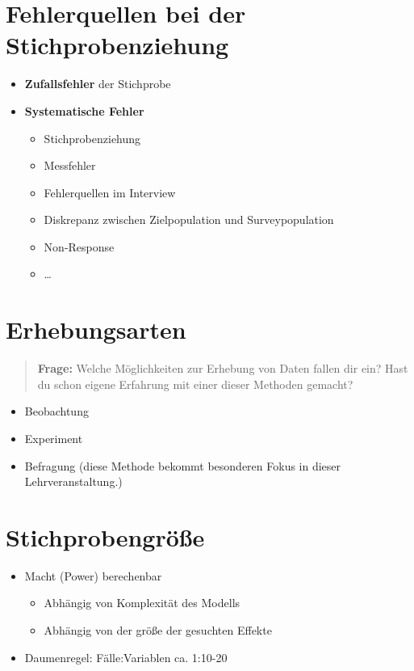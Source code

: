 \documentclass[
]{book}
\providecommand{\tightlist}{%
  \setlength{\itemsep}{0pt}\setlength{\parskip}{0pt}}
\begin{document}
\hypertarget{fehlerquellen-bei-der-stichprobenziehung}{%
\section{Fehlerquellen bei der Stichprobenziehung}\label{fehlerquellen-bei-der-stichprobenziehung}}

\begin{itemize}
\tightlist
\item
  \textbf{Zufallsfehler} der Stichprobe
\item
  \textbf{Systematische Fehler}

  \begin{itemize}
  \tightlist
  \item
    Stichprobenziehung
  \item
    Messfehler
  \item
    Fehlerquellen im Interview
  \item
    Diskrepanz zwischen Zielpopulation und Surveypopulation
  \item
    Non-Response
  \item
    \ldots{}
  \end{itemize}
\end{itemize}

\hypertarget{erhebungsarten}{%
\section{Erhebungsarten}\label{erhebungsarten}}

\begin{quote}
\textbf{Frage:} Welche Möglichkeiten zur Erhebung von Daten fallen dir ein? Hast du schon eigene Erfahrung mit einer dieser Methoden gemacht?
\end{quote}

\begin{itemize}
\tightlist
\item
  Beobachtung
\item
  Experiment
\item
  Befragung (diese Methode bekommt besonderen Fokus in dieser Lehrveranstaltung.)
\end{itemize}

\hypertarget{stichprobengruxf6uxdfe}{%
\section{Stichprobengröße}\label{stichprobengruxf6uxdfe}}

\begin{itemize}
\tightlist
\item
  Macht (Power) berechenbar

  \begin{itemize}
  \tightlist
  \item
    Abhängig von Komplexität des Modells
  \item
    Abhängig von der größe der gesuchten Effekte
  \end{itemize}
\item
  Daumenregel: Fälle:Variablen ca. 1:10-20
\end{itemize}
\end{document}
